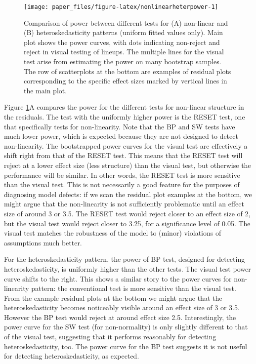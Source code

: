 \documentclass[]{interact}
\theoremstyle{plain}%
\theoremstyle{definition}
\theoremstyle{remark}
\begin{document}
\begin{figure}

{\centering \texttt{[image: paper\_files/figure-latex/nonlinearheterpower-1]} 

}

\caption{Comparison of power between different tests for (A) non-linear and (B) heteroskedasticity patterns (uniform fitted values only). Main plot shows the power curves, with dots indicating non-reject and reject in visual testing of lineups. The multiple lines for the visual test arise from estimating the power on many bootstrap samples. The row of scatterplots at the bottom are examples of residual plots corresponding to the specific effect sizes marked by vertical lines in the main plot.}\label{fig:nonlinearheterpower}
\end{figure}

Figure \ref{fig:nonlinearheterpower}A compares the power for the
different tests for non-linear structure in the residuals. The test with
the uniformly higher power is the RESET test, one that specifically
tests for non-linearity. Note that the BP and SW tests have much lower
power, which is expected because they are not designed to detect
non-linearity. The bootstrapped power curves for the visual test are
effectively a shift right from that of the RESET test. This means that
the RESET test will reject at a lower effect size (less structure) than
the visual test, but otherwise the performance will be similar. In other
words, the RESET test is more sensitive than the visual test. This is
not necessarily a good feature for the purposes of diagnosing model
defects: if we scan the residual plot examples at the bottom, we might
argue that the non-linearity is not sufficiently problematic until an
effect size of around 3 or 3.5. The RESET test would reject closer to an
effect size of 2, but the visual test would reject closer to 3.25, for a
significance level of 0.05. The visual test matches the robustness of
the model to (minor) violations of assumptions much better.

For the heteroskedasticity pattern, the power of BP test, designed for
detecting heteroskedasticity, is uniformly higher than the other tests.
The visual test power curve shifts to the right. This shows a similar
story to the power curves for non-linearity pattern: the conventional
test is more sensitive than the visual test. From the example residual
plots at the bottom we might argue that the heteroskedasticity becomes
noticeably visible around an effect size of 3 or 3.5. However the BP
test would reject at around effect size 2.5. Interestingly, the power
curve for the SW test (for non-normality) is only slightly different to
that of the visual test, suggesting that it performs reasonably for
detecting heteroskedasticity, too. The power curve for the BP test
suggests it is not useful for detecting heteroskedasticity, as expected.
\end{document}
